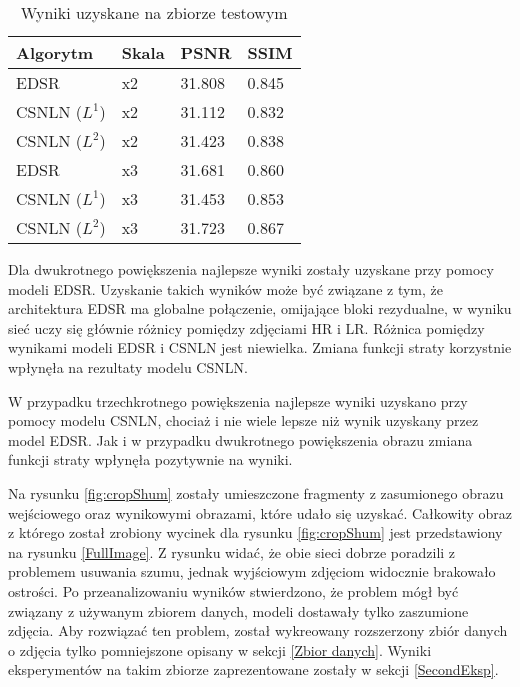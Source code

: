 \documentclass[a4paper,12pt,twoside,openany]{report}
\begin{document}
	\begin{table}[!htbp] 
		\centering
		\begin{tabular}{ |p{3cm}||p{2cm}|p{2cm}|p{2cm}|  }
			\hline
			Algorytm 							      & Skala   & PSNR      & SSIM \\
			\hline
			EDSR                                      &   x2	& 31.808	& 0.845\\
			CSNLN  ($L^1$)  						  &   x2	& 31.112	& 0.832\\
			CSNLN ($L^2$)  							  &   x2	& 31.423	& 0.838\\
			\hline
			EDSR                                      &   x3	& 31.681	& 0.860\\
			CSNLN ($L^1$) 						      &   x3	& 31.453	& 0.853\\
			CSNLN ($L^2$)  							  &   x3	& 31.723	& 0.867\\
			\hline
			
		\end{tabular}
		\caption{Wyniki uzyskane na zbiorze testowym}
		\label{TabelaShum}
	\end{table}

	Dla dwukrotnego powiększenia najlepsze wyniki zostały uzyskane przy pomocy modeli EDSR. Uzyskanie takich wyników może być związane z tym, że architektura EDSR ma globalne połączenie, omijające bloki rezydualne, w wyniku sieć uczy się głównie różnicy pomiędzy zdjęciami HR i LR. Różnica pomiędzy wynikami modeli EDSR i CSNLN jest niewielka. Zmiana funkcji straty korzystnie wpłynęła na rezultaty modelu CSNLN.
	
	W przypadku trzechkrotnego powiększenia najlepsze wyniki uzyskano przy pomocy modelu CSNLN, chociaż i nie wiele lepsze niż wynik uzyskany przez model EDSR. Jak i w przypadku dwukrotnego powiększenia obrazu zmiana funkcji straty wpłynęła pozytywnie na wyniki.
	
	Na rysunku \ref{fig:cropShum} zostały umieszczone fragmenty z zasumionego obrazu wejściowego oraz wynikowymi obrazami, które udało się uzyskać. Całkowity obraz z którego został zrobiony wycinek dla rysunku \ref{fig:cropShum} jest przedstawiony na rysunku \ref{FullImage}. Z rysunku widać, że obie sieci dobrze poradzili z problemem usuwania szumu, jednak wyjściowym zdjęciom widocznie brakowało ostrości. Po przeanalizowaniu wyników stwierdzono, że problem mógł być związany z używanym zbiorem danych, modeli dostawały tylko zaszumione zdjęcia. Aby rozwiązać ten problem, został wykreowany rozszerzony zbiór danych o zdjęcia tylko pomniejszone opisany w sekcji \ref{Zbior danych}. Wyniki eksperymentów na takim zbiorze zaprezentowane zostały w sekcji \ref{SecondEksp}.
	
\end{document}
